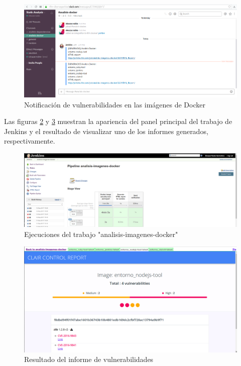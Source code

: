 \begin{figure}[htbp]
	\centering
	\includegraphics[width=1.0\linewidth]
	{desarrollo/figuras/slack_03.png}
	\caption{Notificación de vulnerabilidades en las imágenes de Docker}
	\label{slack_03}
\end{figure}

Las figuras \ref{docker_02} y \ref{docker_03} muestran la apariencia del panel principal del trabajo de Jenkins y el resultado de visualizar uno de los informes generados, respectivamente.

\begin{figure}[htbp]
	\centering
	\includegraphics[width=1.00\linewidth]
	{desarrollo/figuras/docker_02.png}
	\caption{Ejecuciones del trabajo "analisis-imagenes-docker"}
	\label{docker_02}
\end{figure}

\begin{figure}[H]
	\centering
	\includegraphics[width=1.00\linewidth]
	{desarrollo/figuras/docker_03.png}
	\caption{Resultado del informe de vulnerabilidades}
	\label{docker_03}
\end{figure}

